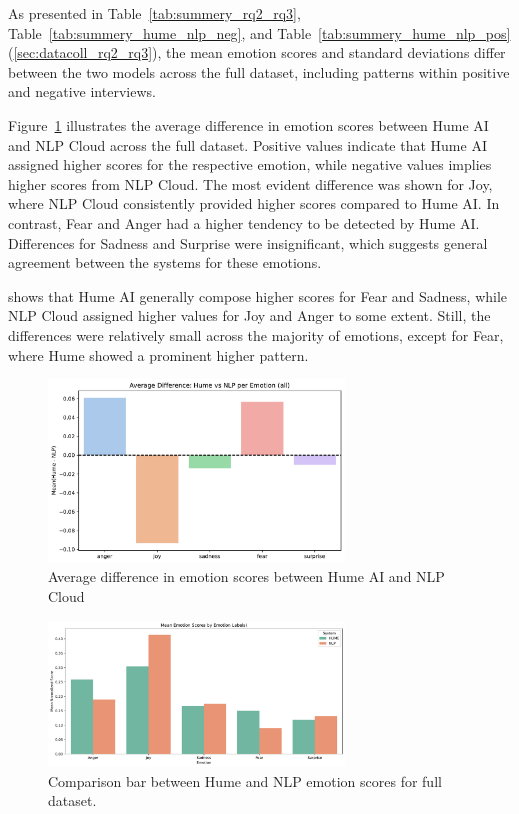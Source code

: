 As presented in Table~\ref{tab:summery_rq2_rq3}, Table~\ref{tab:summery_hume_nlp_neg}, and Table~\ref{tab:summery_hume_nlp_pos} (\ref{sec:datacoll_rq2_rq3}),
the mean emotion scores and standard deviations differ between the two models across the full dataset,
including patterns within positive and negative interviews. 

Figure~\ref{fig:comp_bar_full_rq2} illustrates the average difference in emotion scores between Hume AI and NLP Cloud across the full dataset. Positive values indicate that Hume AI assigned 
higher scores for the respective emotion, while negative values implies higher scores from NLP Cloud. The most evident difference was shown for Joy, where 
NLP Cloud consistently provided higher scores compared to Hume AI. In contrast, Fear and Anger had a higher tendency to be detected by Hume AI. 
Differences for Sadness and Surprise were insignificant, which suggests general agreement between the systems for these emotions. 

shows that Hume AI generally compose higher scores for Fear and Sadness, while NLP Cloud assigned higher values for 
Joy and Anger to some extent. Still, the differences were relatively small across the majority of emotions, 
except for Fear, where Hume showed a prominent higher pattern. 

\begin{figure}[!h]
    \centering
    \includegraphics[width=0.7\textwidth]{png/results/rq2/hume_nlp_difference_all.pdf}
    \caption{Average difference in emotion scores between Hume AI and NLP Cloud}
    \label{fig:comp_bar_full_rq2}
\end{figure}

\begin{figure}
\centering
\includegraphics[width=0.7\textwidth]{png/results/rq2/sentiment_comparison_bar.pdf}
\caption{Comparison bar between Hume and NLP emotion scores for full dataset.}
\label{fig:sentiment_bar_full_rq2}
\end{figure}

